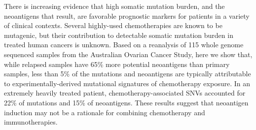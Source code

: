 There is increasing evidence that high somatic mutation burden, and the neoantigens that result, are favorable prognostic markers for patients in a variety of clinical contexts. Several highly-used chemotherapies are known to be mutagenic, but their contribution to detectable somatic mutation burden in treated human cancers is unknown. Based on a reanalysis of 115 whole genome sequenced samples from the Australian Ovarian Cancer Study, here we show that, while relapsed samples have 65\% more potential neoantigens than primary samples, less than 5\% of the mutations and neoantigens are typically attributable to experimentally-derived mutational signatures of chemotherapy exposure. In an extremely heavily treated patient, chemotherapy-associated SNVs accounted for 22\% of mutations and 15\% of neoantigens. These results suggest that neoantigen induction may not be a rationale for combining chemotherapy and immunotherapies.



